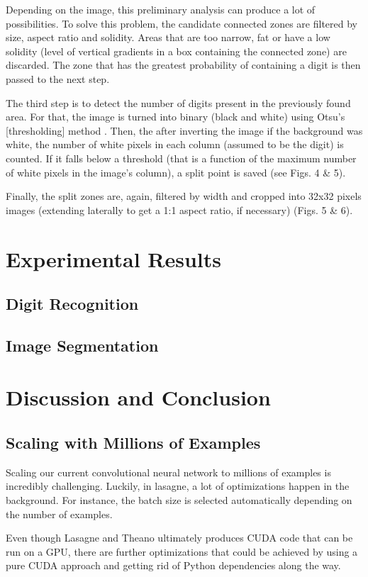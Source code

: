 \documentclass{article} %
\begin{document}
Depending on the image, this preliminary analysis can produce a lot of possibilities. To solve this problem, the candidate connected zones are filtered by size, aspect ratio and solidity. Areas that are too narrow, fat or have a low solidity (level of vertical gradients in a box containing the connected zone) are discarded. The zone that has the greatest probability of containing a digit is then passed to the next step.

The third step is to detect the number of digits present in the previously found area. For that, the image is turned into binary (black and white) using Otsu’s [thresholding] method . Then, the after inverting the image if the background was white, the number of white pixels in each column (assumed to be the digit) is counted. If it falls below a threshold (that is a function of the maximum number of white pixels in the image’s column), a split point is saved (see Figs. 4 \& 5).

Finally, the split zones are, again, filtered by width and cropped into 32x32 pixels images (extending laterally to get a 1:1 aspect ratio, if necessary) (Figs. 5 \& 6).


\section{Experimental Results}
\subsection{Digit Recognition}
\subsection{Image Segmentation}

\section{Discussion and Conclusion}
\subsection{Scaling with Millions of Examples}
Scaling our current convolutional neural network to millions of examples is incredibly challenging. Luckily, in lasagne, a lot of optimizations happen in the background. For instance, the batch size is selected automatically depending on the number of examples.

Even though Lasagne and Theano ultimately produces CUDA code that can be run on a GPU, there are further optimizations that could be achieved by using a pure CUDA approach and getting rid of Python dependencies along the way. 
\end{document}
